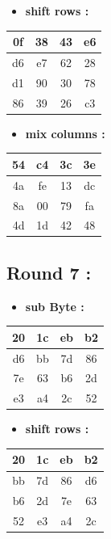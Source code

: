 \documentclass{article}
\begin{document}
\begin{itemize}
    \item \textbf{shift rows :}
\end{itemize} \begin{tabular}{|c|c|c|c|}
\hline 0f & 38 & 43 & e6 \\ \hline d6 & e7 & 62 & 28 \\ \hline d1 & 90 & 30 & 78 \\ \hline 86 & 39 & 26 & c3 \\ \hline \end{tabular}\hspace{0.5cm}\vspace{0.1cm}\begin{itemize}
    \item \textbf{mix columns :}
\end{itemize} \begin{tabular}{|c|c|c|c|}
\hline 54 & c4 & 3c & 3e \\ \hline 4a & fe & 13 & dc \\ \hline 8a & 00 & 79 & fa \\ \hline 4d & 1d & 42 & 48 \\ \hline \end{tabular}\hspace{0.5cm}\vspace{0.1cm}\subsection*{Round 7 : }\begin{itemize}
    \item \textbf{sub Byte :}
\end{itemize} \begin{tabular}{|c|c|c|c|}
\hline 20 & 1c & eb & b2 \\ \hline d6 & bb & 7d & 86 \\ \hline 7e & 63 & b6 & 2d \\ \hline e3 & a4 & 2c & 52 \\ \hline \end{tabular}\hspace{0.5cm}\vspace{0.1cm}\begin{itemize}
    \item \textbf{shift rows :}
\end{itemize} \begin{tabular}{|c|c|c|c|}
\hline 20 & 1c & eb & b2 \\ \hline bb & 7d & 86 & d6 \\ \hline b6 & 2d & 7e & 63 \\ \hline 52 & e3 & a4 & 2c \\ \hline \end{tabular}\hspace{0.5cm}\vspace{0.1cm}\begin{itemize}

\end{itemize}
\end{document}
